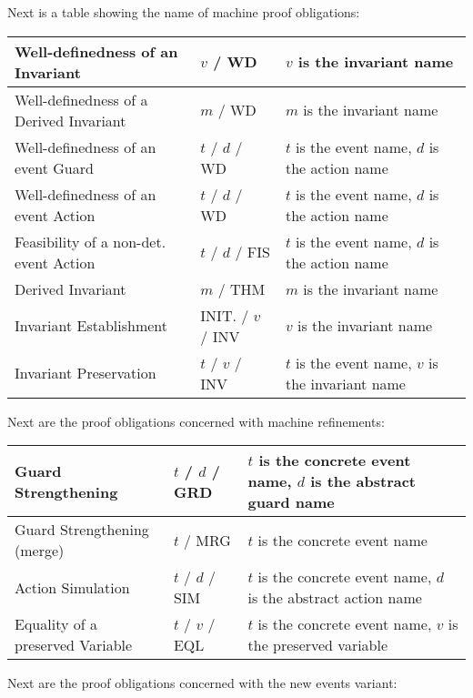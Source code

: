 Next is a table showing the name of machine proof obligations:

\begin{center}
    \begin{tabular}{| p{6cm} | p{3cm} | p{5cm} |}
    \hline
	Well-definedness of an Invariant & $v$  / WD & $v$ is the invariant name\\ \hline
	Well-definedness of a Derived Invariant & $m$  / WD & $m$ is the invariant name \\ \hline
	Well-definedness of an event Guard & $t$  / $d$  / WD & $t$ is the event name, $d$ is the action name  \\ \hline
	Well-definedness of an event Action & $t$  / $d$  / WD & $t$ is the event name, $d$ is the action name  \\ \hline
	Feasibility of a non-det. event Action & $t$  / $d$  / FIS & $t$ is the event name, $d$ is the action name  \\ \hline
	Derived Invariant & $m$ / THM & $m$ is the invariant name \\ \hline
	Invariant Establishment & INIT.  / $v$  / INV & $v$ is the invariant name  \\ \hline
	Invariant Preservation & $t$  / $v$  / INV & $t$ is the event name, $v$ is the invariant name  \\ \hline
    \end{tabular}
\end{center}

Next are the proof obligations concerned with machine refinements:

\begin{center}
    \begin{tabular}{| p{6cm} | p{3cm} | p{5cm} |}
    \hline
	Guard Strengthening & $t$  / $d$  / GRD & $t$ is the concrete event name, $d$ is the abstract guard name\\ \hline
	Guard Strengthening (merge) & $t$  / MRG & $t$ is the concrete event name \\ \hline
	Action Simulation & $t$  / $d$  / SIM & $t$ is the concrete event name, $d$ is the abstract action name  \\ \hline
	Equality of a preserved Variable & $t$  / $v$  / EQL & $t$ is the concrete event name, $v$ is the preserved variable  \\ \hline
    \end{tabular}
\end{center}

Next are the proof obligations concerned with the new events variant:


